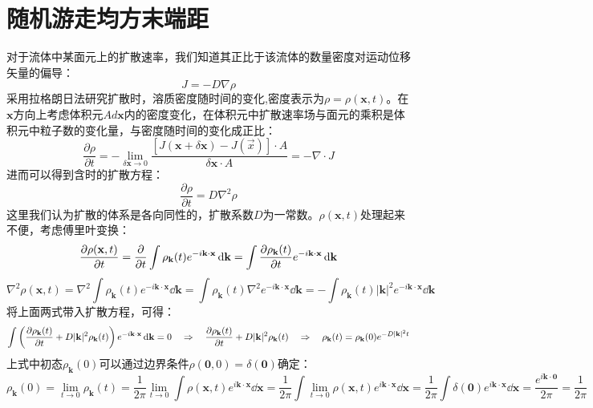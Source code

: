 \section{随机游走均方末端距}
对于流体中某面元上的扩散速率，我们知道其正比于该流体的数量密度对运动位移矢量的偏导：
\[J=-D\nabla\rho\]
采用拉格朗日法研究扩散时，溶质密度随时间的变化,密度表示为$\rho=\rho(\mathbf{x},t)$。在$\mathbf{x}$方向上考虑体积元$Ad\mathbf{x}$内的密度变化，在体积元中扩散速率场与面元的乘积是体积元中粒子数的变化量，与密度随时间的变化成正比：
\[\frac{\partial \rho}{\partial t}=-\lim_{\delta \mathbf{x} \rightarrow 0} \frac{[J(\mathbf{x}+\delta\mathbf{x})-J(\vec{x})] \cdot A}{\delta \mathbf{x} \cdot A} =-\nabla \cdot J\]
进而可以得到含时的扩散方程：
\[\frac{\partial \rho}{\partial t}=D\nabla^2\rho\]
这里我们认为扩散的体系是各向同性的，扩散系数$D$为一常数。$\rho(\mathbf{x},t)$处理起来不便，考虑傅里叶变换：
\[\pdv{\rho(\mathbf{x},t)}{t}=\pdv{t}\int\rho_{\mathbf{k}}(t)e^{-i\mathbf{k}\cdot\mathbf{x}}\dd{\mathbf{k}}=\int\pdv{\rho_{\mathbf{k}}(t)}{t}e^{-i\mathbf{k}\cdot\mathbf{x}}\dd{\mathbf{k}}\]
\[\nabla^2\rho(\mathbf{x},t)=\nabla^2\int\rho_{\mathbf{k}}(t)e^{-i\mathbf{k}\cdot\mathbf{x}}\dd{\mathbf{k}}=\int\rho_{\mathbf{k}}(t)\nabla^2e^{-i\mathbf{k}\cdot\mathbf{x}}\dd{\mathbf{k}}=-\int\rho_{\mathbf{k}}(t)|\mathbf{k}|^2e^{-i\mathbf{k}\cdot\mathbf{x}}\dd{\mathbf{k}}\]
将上面两式带入扩散方程，可得：
\[\int\left(\pdv{\rho_{\mathbf{k}}(t)}{t}+D|\mathbf{k}|^2\rho_{\mathbf{k}}(t)\right)e^{-i\mathbf{k}\cdot\mathbf{x}}\dd{\mathbf{k}}=0 \quad \Rightarrow \quad \pdv{\rho_{\mathbf{k}}(t)}{t}+D|\mathbf{k}|^2\rho_{\mathbf{k}}(t) \quad \Rightarrow \quad \rho_{\mathbf{k}}(t)=\rho_{\mathbf{k}}(0)e^{-D|\mathbf{k}|^2t}\]
上式中初态$\rho_{\mathbf{k}}(0)$可以通过边界条件$\rho(\mathbf{0},0)=\delta(\mathbf{0})$确定：
\[\rho_{\mathbf{k}}(0)=\lim_{t \to 0}\rho_{\mathbf{k}}(t)=\frac{1}{2\pi}\lim_{t \to 0}\int\rho(\mathbf{x},t)e^{i\mathbf{k}\cdot\mathbf{x}}\dd{\mathbf{x}}=\frac{1}{2\pi}\int\lim_{t \to 0}\rho(\mathbf{x},t)e^{i\mathbf{k}\cdot\mathbf{x}}\dd{\mathbf{x}}=\frac{1}{2\pi}\int\delta(\mathbf{0})e^{i\mathbf{k}\cdot\mathbf{x}}\dd{\mathbf{x}}=\frac{e^{i\mathbf{k}\cdot\mathbf{0}}}{2\pi}=\frac{1}{2\pi}\]

